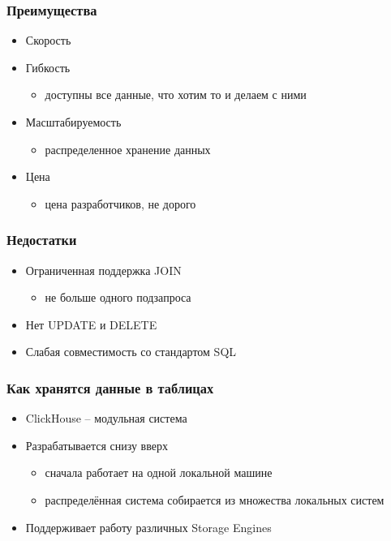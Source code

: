\documentclass[xetex,mathserif,serif]{beamer}
\begin{document}
\begin{frame}
	\frametitle{Преимущества}

	\begin{itemize}
		\item Скорость
		\item Гибкость
		      \begin{itemize}
			      \item доступны все данные, что хотим то и делаем с ними
		      \end{itemize}
		\item Масштабируемость
		      \begin{itemize}
			      \item распределенное хранение данных
		      \end{itemize}
		\item Цена
		      \begin{itemize}
			      \item цена разработчиков, не дорого
		      \end{itemize}
	\end{itemize}
\end{frame}


\begin{frame}
	\frametitle{Недостатки}

	\begin{itemize}
		\item Ограниченная поддержка JOIN
		      \begin{itemize}
			      \item не больше одного подзапроса
		      \end{itemize}
		\item Нет UPDATE и DELETE
		\item Слабая совместимость со стандартом SQL
	\end{itemize}
\end{frame}


\begin{frame}
	\frametitle{Как хранятся данные в таблицах}

	\begin{itemize}
		\item ClickHouse -- модульная система
		\item Разрабатывается снизу вверх
		      \begin{itemize}
			      \item сначала работает на одной локальной машине
			      \item распределённая система собирается из множества локальных систем
		      \end{itemize}
		\item Поддерживает работу различных Storage Engines
	\end{itemize}
\end{frame}
\end{document}

